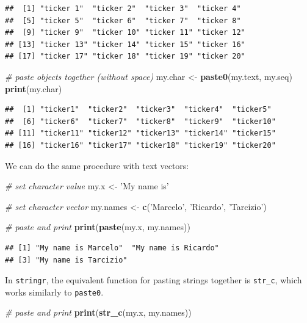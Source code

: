 \documentclass[11pt,]{book}
\newenvironment{Shaded}{\begin{snugshade}}{\end{snugshade}}
\newcommand{\KeywordTok}[1]{\textcolor[rgb]{0.27,0.27,0.27}{\textbf{#1}}}
\newcommand{\StringTok}[1]{\textcolor[rgb]{0.5,0.5,0.5}{#1}}
\newcommand{\CommentTok}[1]{\textcolor[rgb]{0.56,0.35,0.01}{\textit{#1}}}
\newcommand{\NormalTok}[1]{#1}
\begin{document}
\begin{verbatim}
##  [1] "ticker 1"  "ticker 2"  "ticker 3"  "ticker 4" 
##  [5] "ticker 5"  "ticker 6"  "ticker 7"  "ticker 8" 
##  [9] "ticker 9"  "ticker 10" "ticker 11" "ticker 12"
## [13] "ticker 13" "ticker 14" "ticker 15" "ticker 16"
## [17] "ticker 17" "ticker 18" "ticker 19" "ticker 20"
\end{verbatim}

\begin{Shaded}
\begin{Highlighting}[]
\CommentTok{# paste objects together (without space)}
\NormalTok{my.char <-}\StringTok{ }\KeywordTok{paste0}\NormalTok{(my.text, my.seq)}
\KeywordTok{print}\NormalTok{(my.char)}
\end{Highlighting}
\end{Shaded}

\begin{verbatim}
##  [1] "ticker1"  "ticker2"  "ticker3"  "ticker4"  "ticker5" 
##  [6] "ticker6"  "ticker7"  "ticker8"  "ticker9"  "ticker10"
## [11] "ticker11" "ticker12" "ticker13" "ticker14" "ticker15"
## [16] "ticker16" "ticker17" "ticker18" "ticker19" "ticker20"
\end{verbatim}

We can do the same procedure with text vectors:

\begin{Shaded}
\begin{Highlighting}[]
\CommentTok{# set character value}
\NormalTok{my.x <-}\StringTok{ 'My name is'}

\CommentTok{# set character vector}
\NormalTok{my.names <-}\StringTok{ }\KeywordTok{c}\NormalTok{(}\StringTok{'Marcelo'}\NormalTok{, }\StringTok{'Ricardo'}\NormalTok{, }\StringTok{'Tarcizio'}\NormalTok{)}

\CommentTok{# paste and print}
\KeywordTok{print}\NormalTok{(}\KeywordTok{paste}\NormalTok{(my.x, my.names))}
\end{Highlighting}
\end{Shaded}

\begin{verbatim}
## [1] "My name is Marcelo"  "My name is Ricardo" 
## [3] "My name is Tarcizio"
\end{verbatim}

In \texttt{stringr}, the equivalent function for pasting strings
together is \texttt{str\_c}, which works similarly to \texttt{paste0}.

\begin{Shaded}
\begin{Highlighting}[]
\CommentTok{# paste and print}
\KeywordTok{print}\NormalTok{(}\KeywordTok{str_c}\NormalTok{(my.x, my.names))}
\end{Highlighting}
\end{Shaded}
\end{document}
